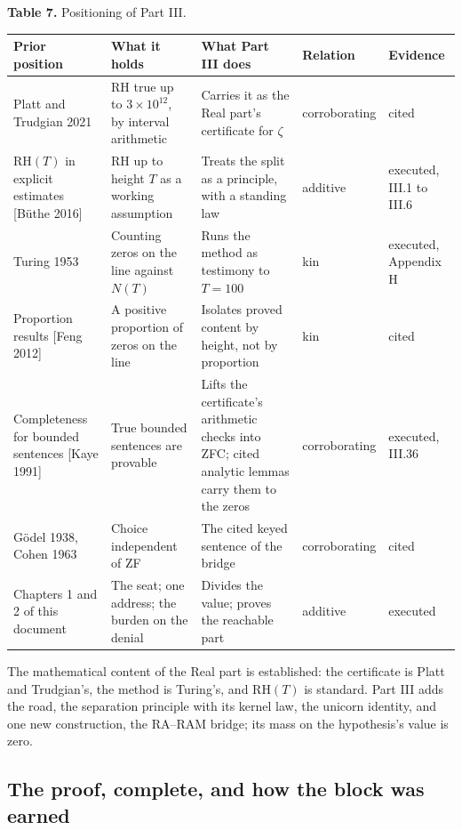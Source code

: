 \documentclass[10pt]{article}
\begin{document}
\begin{table}[!htbp]
\centering\small
\renewcommand{\arraystretch}{1.12}
\raggedright \textbf{Table 7.} Positioning of Part III.\par\smallskip
\begin{tabularx}{\textwidth}{@{}P{0.18\textwidth} P{0.19\textwidth} L P{0.115\textwidth} P{0.115\textwidth}@{}}
\toprule
\textbf{Prior position} & \textbf{What it holds} & \textbf{What Part III does} & \textbf{Relation} & \textbf{Evidence} \\
\midrule
Platt and Trudgian 2021 & RH true up to \(3 \times 10^{12}\), by interval arithmetic & Carries it as the Real part's certificate for \(\zeta\) & corroborating & cited \\
\(\mathrm{RH}(T)\) in explicit estimates {[}Büthe 2016{]} & RH up to height \(T\) as a working assumption & Treats the split as a principle, with a standing law & additive & executed, III.1 to III.6 \\
Turing 1953 & Counting zeros on the line against \(N(T)\) & Runs the method as testimony to \(T = 100\) & kin & executed, Appendix H \\
Proportion results {[}Feng 2012{]} & A positive proportion of zeros on the line & Isolates proved content by height, not by proportion & kin & cited \\
Completeness for bounded sentences {[}Kaye 1991{]} & True bounded sentences are provable & Lifts the certificate's arithmetic checks into ZFC; cited analytic lemmas carry them to the zeros & corroborating & executed, III.36 \\
Gödel 1938, Cohen 1963 & Choice independent of ZF & The cited keyed sentence of the bridge & corroborating & cited \\
Chapters 1 and 2 of this document & The seat; one address; the burden on the denial & Divides the value; proves the reachable part & additive & executed \\
\bottomrule
\end{tabularx}
\end{table}

The mathematical content of the Real part is established: the
certificate is Platt and Trudgian's, the method is Turing's, and
\(\mathrm{RH}(T)\) is standard. Part III adds the road, the separation
principle with its kernel law, the unicorn identity, and one new
construction, the RA--RAM bridge; its mass on the hypothesis's value is
zero.

\hypertarget{the-proof-complete-and-how-the-block-was-earned}{%
\subsection{The proof, complete, and how the block was
earned}\label{the-proof-complete-and-how-the-block-was-earned}}
\end{document}
